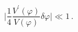\begin{equation}\label{condforV}
\Biggr| \frac {1}{4} \frac {V^{\prime}(\varphi)}{V(\varphi)}\delta\varphi \Biggr|
\ll 1 \, .
\end{equation}

